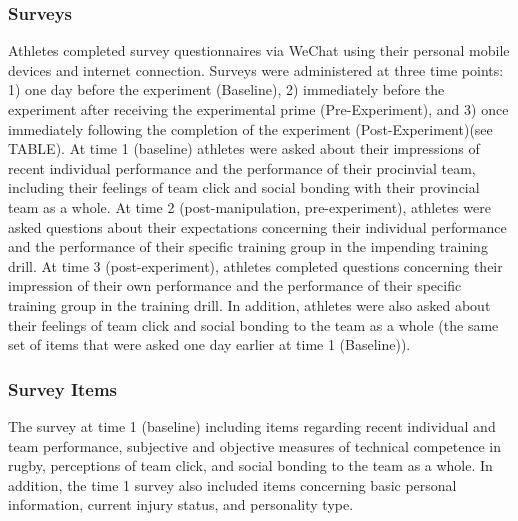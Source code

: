 \documentclass[english]{article}\usepackage[]{graphicx}\usepackage[]{color}
\begin{document}
\subsubsection{Surveys}
Athletes completed survey questionnaires via WeChat using their personal mobile devices and internet connection. Surveys were administered at three time points: 1) one day before the experiment (Baseline), 2) immediately before the experiment after receiving the experimental prime (Pre-Experiment), and 3) once immediately following the completion of the experiment (Post-Experiment)(see TABLE).  At time 1 (baseline) athletes were asked about their impressions of recent individual performance and the performance of their procinvial team, including their feelings of team click and social bonding with their provincial team as a whole.  At time 2 (post-manipulation, pre-experiment), athletes were asked questions about their expectations concerning their individual performance and the performance of their specific training group in the impending training drill.  At time 3 (post-experiment), athletes completed questions concerning their impression of their own performance and the performance of their specific training group in the training drill. In addition, athletes were also asked about their feelings of team click and social bonding to the team as a whole (the same set of items that were asked one day earlier at time 1 (Baseline)).

\subsubsection{Survey Items}

The survey at time 1 (baseline) including items regarding recent individual and team performance, subjective and objective measures of technical competence in rugby, perceptions of team click, and social bonding to the team as a whole.  In addition, the time 1 survey also included items concerning basic personal information, current injury status, and personality type.

\end{document}
